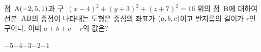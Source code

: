 점~$\mathrm{A}(-2{,}\mkern3mu\mathopen{}5{,}\mkern3mu\mathopen{}1)$과 구~$(x-4)^2+(y+3)^2+(z+7)^2=16$ 위의 점~$\mathrm{B}$에 대하여 선분~$\mathrm{AB}$의 중점이 나타내는 도형은 중심의 좌표가 $(a{,}\mkern3mu\mathopen{}b{,}\mkern3mu\mathopen{}c)$이고 반지름의 길이가 $r$인 구이다. 이때 $a+b+c-r$의 값은?
\begin{choices32}{$-5$}{$-4$}{$-3$}{$-2$}{$-1$}\end{choices32}
